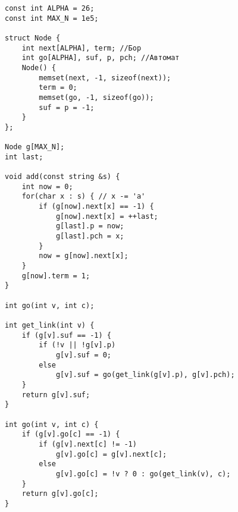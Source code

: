 \begin{verbatim}
const int ALPHA = 26;
const int MAX_N = 1e5;

struct Node {
	int next[ALPHA], term; //Бор
	int go[ALPHA], suf, p, pch; //Автомат
	Node() {
		memset(next, -1, sizeof(next));
		term = 0;
		memset(go, -1, sizeof(go));
		suf = p = -1;
	}
};

Node g[MAX_N];
int last;

void add(const string &s) {
	int now = 0;
	for(char x : s) { // x -= 'a'
		if (g[now].next[x] == -1) {
			g[now].next[x] = ++last;
			g[last].p = now;
			g[last].pch = x;
		} 
		now = g[now].next[x];
	}
	g[now].term = 1;
}

int go(int v, int c);

int get_link(int v) {
	if (g[v].suf == -1) { 
		if (!v || !g[v].p)
			g[v].suf = 0;
		else
			g[v].suf = go(get_link(g[v].p), g[v].pch);
	}
	return g[v].suf;
}

int go(int v, int c) {
	if (g[v].go[c] == -1) {
		if (g[v].next[c] != -1)
			g[v].go[c] = g[v].next[c];
		else
			g[v].go[c] = !v ? 0 : go(get_link(v), c);
	}
	return g[v].go[c];
}
\end{verbatim}
